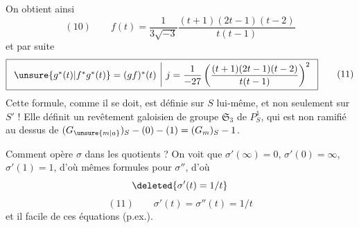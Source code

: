 On obtient ainsi
\[
(10)\qquad f(t)=\frac1{3\sqrt{-3}}\frac{(t+1)(2t-1)(t-2)}{t(t-1)}
\]
et par suite
\[
\boxed{\begin{array}{c|c}\unsure{g^*(t)|f^*g^*(t)}=(gf)^*(t)&j=\dfrac1{-27}\left(\dfrac{(t+1)(2t-1)(t-2)}{t(t-1)}\right)^2\end{array}}\qquad(11)
\]
Cette formule, comme il se doit, est définie sur $S$ lui-même, et non seulement sur $S'$ ! Elle définit un revêtement galoisien de groupe $\mathfrak S_3$ de  $P^1_S$,  qui est non ramifié au dessus de $(G_{\unsure{m|a}})_S-(0)-(1)=(G_m)_S-1$.

Comment opère $\sigma$ dans les quotients ?
On voit que $\sigma'(\infty)=0$, $\sigma'(0)=\infty$, $\sigma'(1)=1$, d'où mêmes formules pour $\sigma''$, d'où
\[
\deleted{\sigma'(t)=1/t}
\]
\[
(11)\qquad\sigma'(t)=\sigma''(t)=1/t
\]
et il  facile de  ces équations  (p.ex.).
